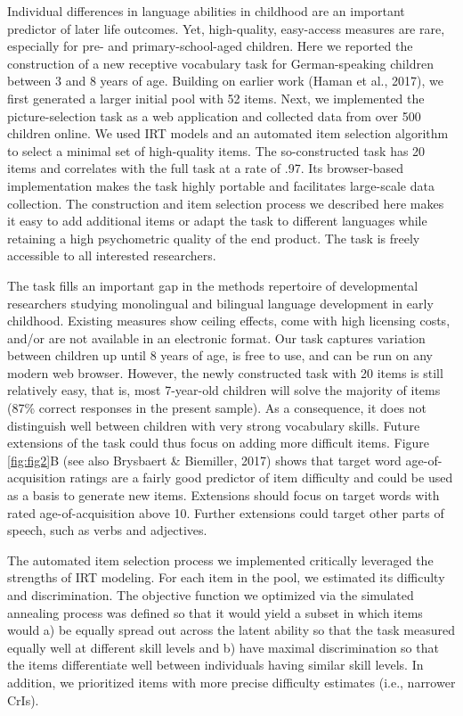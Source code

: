 \documentclass[
  man,floatsintext]{apa6}
\begin{document}
Individual differences in language abilities in childhood are an important predictor of later life outcomes. Yet, high-quality, easy-access measures are rare, especially for pre- and primary-school-aged children. Here we reported the construction of a new receptive vocabulary task for German-speaking children between 3 and 8 years of age. Building on earlier work (Haman et al., 2017), we first generated a larger initial pool with 52 items. Next, we implemented the picture-selection task as a web application and collected data from over 500 children online. We used IRT models and an automated item selection algorithm to select a minimal set of high-quality items. The so-constructed task has 20 items and correlates with the full task at a rate of .97. Its browser-based implementation makes the task highly portable and facilitates large-scale data collection. The construction and item selection process we described here makes it easy to add additional items or adapt the task to different languages while retaining a high psychometric quality of the end product. The task is freely accessible to all interested researchers.

The task fills an important gap in the methods repertoire of developmental researchers studying monolingual and bilingual language development in early childhood. Existing measures show ceiling effects, come with high licensing costs, and/or are not available in an electronic format. Our task captures variation between children up until 8 years of age, is free to use, and can be run on any modern web browser. However, the newly constructed task with 20 items is still relatively easy, that is, most 7-year-old children will solve the majority of items (87\% correct responses in the present sample). As a consequence, it does not distinguish well between children with very strong vocabulary skills. Future extensions of the task could thus focus on adding more difficult items. Figure \ref{fig:fig2}B (see also Brysbaert \& Biemiller, 2017) shows that target word age-of-acquisition ratings are a fairly good predictor of item difficulty and could be used as a basis to generate new items. Extensions should focus on target words with rated age-of-acquisition above 10. Further extensions could target other parts of speech, such as verbs and adjectives.

The automated item selection process we implemented critically leveraged the strengths of IRT modeling. For each item in the pool, we estimated its difficulty and discrimination. The objective function we optimized via the simulated annealing process was defined so that it would yield a subset in which items would a) be equally spread out across the latent ability so that the task measured equally well at different skill levels and b) have maximal discrimination so that the items differentiate well between individuals having similar skill levels. In addition, we prioritized items with more precise difficulty estimates (i.e., narrower CrIs).
\end{document}
